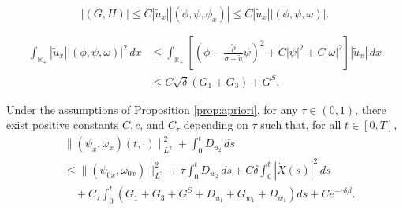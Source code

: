 \documentclass[10pt,a4paper]{amsart}
\begin{document}
\begin{equation} \label{eq:GH-est}
|(G, H)|\le C|\tilde{u}_x||(\phi,\psi,\phi_x)| \le C|\tilde{u}_x||(\phi,\psi,\omega)|.
\end{equation}

\begin{equation} \label{est-quadratic}
\begin{aligned}
\int_{\mathbb{R}_+} |\tilde{u}_x| |(\phi,\psi,\omega)|^2 \, dx 
&\le \int_{\mathbb{R}_+} \left[ \left( \phi-\frac{\tilde{\rho}}{\sigma-\tilde{u}}\psi\right)^2 + C |\psi|^2 + C|\omega|^2 \right] |\tilde{u}_x| \, dx \\
&\le C \sqrt{\delta} (G_1 + G_3) + G^S.
\end{aligned}
\end{equation}

\begin{lemma}\label{lem:higher2}
	Under the assumptions of Proposition \ref{prop:apriori}, for any $\tau \in (0,1)$, there exist positive constants $C, c$, and $C_\tau$ depending on $\tau$ such that, for all $t \in [0,T]$,
	\begin{equation} \label{est-higher-2}
		\begin{aligned}
			&\|(\psi_x, \omega_x)(t,\cdot)\|_{L^2}^2 + \int_0^t D_{u_2} \,ds \\
			&\le  \|(\psi_{0x}, \omega_{0x})\|_{L^2}^2 + \tau \int_0^t D_{w_2} \,ds + C\delta \int_0^t |\dot{X}(s)|^2 \,ds \\
			&\quad + C_\tau \int_0^t \left(G_1 + G_3 + G^S+ D_{u_1} + G_{w_1} + D_{w_1}   \right) ds + C e^{-c\delta \beta}.
		\end{aligned}
	\end{equation}
\end{lemma}
\end{document}

